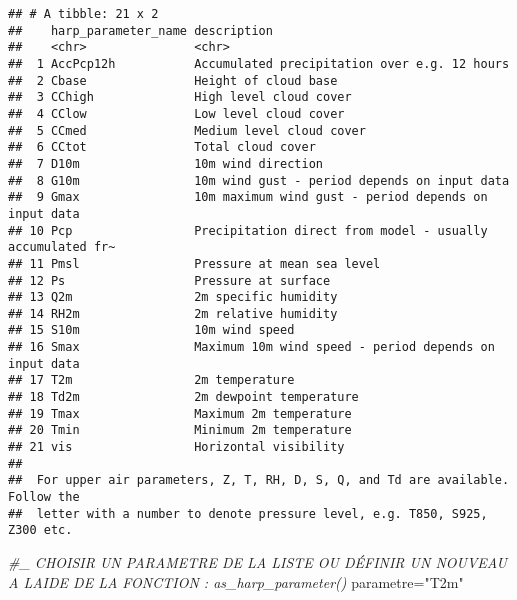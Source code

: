 \documentclass[
]{article}
\newenvironment{Shaded}{\begin{snugshade}}{\end{snugshade}}
\newcommand{\CommentTok}[1]{\textcolor[rgb]{0.56,0.35,0.01}{\textit{#1}}}
\newcommand{\NormalTok}[1]{#1}
\newcommand{\OtherTok}[1]{\textcolor[rgb]{0.56,0.35,0.01}{#1}}
\newcommand{\StringTok}[1]{\textcolor[rgb]{0.31,0.60,0.02}{#1}}
\begin{document}
\begin{verbatim}
## # A tibble: 21 x 2
##    harp_parameter_name description                                              
##    <chr>               <chr>                                                    
##  1 AccPcp12h           Accumulated precipitation over e.g. 12 hours             
##  2 Cbase               Height of cloud base                                     
##  3 CChigh              High level cloud cover                                   
##  4 CClow               Low level cloud cover                                    
##  5 CCmed               Medium level cloud cover                                 
##  6 CCtot               Total cloud cover                                        
##  7 D10m                10m wind direction                                       
##  8 G10m                10m wind gust - period depends on input data             
##  9 Gmax                10m maximum wind gust - period depends on input data     
## 10 Pcp                 Precipitation direct from model - usually accumulated fr~
## 11 Pmsl                Pressure at mean sea level                               
## 12 Ps                  Pressure at surface                                      
## 13 Q2m                 2m specific humidity                                     
## 14 RH2m                2m relative humidity                                     
## 15 S10m                10m wind speed                                           
## 16 Smax                Maximum 10m wind speed - period depends on input data    
## 17 T2m                 2m temperature                                           
## 18 Td2m                2m dewpoint temperature                                  
## 19 Tmax                Maximum 2m temperature                                   
## 20 Tmin                Minimum 2m temperature                                   
## 21 vis                 Horizontal visibility                                    
## 
##  For upper air parameters, Z, T, RH, D, S, Q, and Td are available. Follow the
##  letter with a number to denote pressure level, e.g. T850, S925, Z300 etc.
\end{verbatim}

\begin{Shaded}
\begin{Highlighting}[]
\CommentTok{\#\_ CHOISIR UN PARAMETRE DE LA LISTE OU DÉFINIR UN NOUVEAU A L\textquotesingle{}AIDE DE LA FONCTION : as\_harp\_parameter() }
\NormalTok{parametre}\OtherTok{=}\StringTok{"T2m"}
\end{Highlighting}
\end{Shaded}
\end{document}
